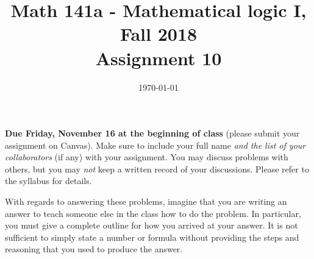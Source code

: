 \documentclass{amsart}
\title[Math 141a, Fall 2018: assignment 10]{Math 141a - Mathematical logic I, Fall 2018 \\ Assignment 10}
\date{\today}
\theoremstyle{definition}
\begin{document}

\maketitle

\textbf{Due Friday, November 16 at the beginning of class} (please submit your assignment on Canvas). Make sure to include your full name \emph{and the list of your collaborators} (if any) with your assignment. You may discuss problems with others, but you may \emph{not} keep a written record of your discussions. Please refer to the syllabus for details.

With regards to answering these problems, imagine that you are writing an answer to teach someone else in the class how to do the problem. In particular, you must give a complete outline for how you arrived at your answer. It is not sufficient to simply state a number or formula without providing the steps and reasoning that you used to produce the answer.
\end{document}
